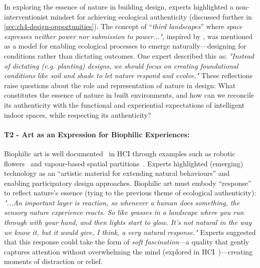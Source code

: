 In exploring the essence of nature in building design, experts highlighted a non-interventionist mindset for achieving ecological authenticity (discussed further in \autoref{sec:ch4-design-opportunities}). The concept of ``\emph{third landscapes}'' where \textit{space expresses neither power nor submission to power..."}, inspired by \citet{clement2004manifeste}, was mentioned as a model for enabling ecological processes to emerge naturally---designing for conditions rather than dictating outcomes. One expert described this as: \textit{"Instead of dictating (e.g. planting) designs, we should focus on creating foundational conditions like soil and shade to let nature respond and evolve."} These reflections raise questions about the role and representation of nature in design: What constitutes the essence of nature in built environments, and how can we reconcile its authenticity with the functional and experiential expectations of intelligent indoor spaces, while respecting its authenticity?


\paragraph{T2 - Art as an Expression for Biophilic Experiences:}
\label{theme:t2}

Biophilic art is well documented~\cite{miles2010representing, brady2019aesthetics} in HCI through examples such as robotic flowers~\cite{chooi2022symbiosis} and vapour-based spatial partitions~\cite{deng2019diffusive}. Experts highlighted (emerging) technology as an ``artistic material for extending natural behaviours'' and enabling participatory design approaches. Biophilic art must embody ``response'' to reflect nature’s essence (tying to the previous theme of ecological authenticity):  \textit{"...An important layer is reaction, so whenever a human does something, the sensory nature experience reacts. So like grasses in a landscape where you run through with your hand, and then lights start to glow. It’s not natural in the way we know it, but it would give, I think, a very natural response."} Experts suggested that this response could take the form of \emph{soft fascination}---a quality that gently captures attention without overwhelming the mind (explored in HCI~\cite{basu2019attention, sabinson2024every})---creating moments of distraction or relief.


